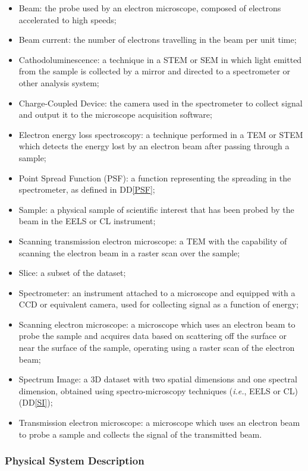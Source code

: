 \documentclass[12pt]{article}
\newcommand{\ddref}[1]{DD\ref{#1}}
\begin{document}
\begin{itemize}
	\item Beam: the probe used by an electron microscope, composed of electrons accelerated to high speeds;
	\item Beam current: the number of electrons travelling in the beam per unit time;
	\item Cathodoluminescence: a technique in a STEM or SEM in which light emitted from the sample is collected by a mirror and directed to a spectrometer or other analysis system;
	\item Charge-Coupled Device: the camera used in the spectrometer to collect signal and output it to the microscope acquisition software;
	\item Electron energy loss spectroscopy: a technique performed in a TEM or STEM which detects the energy lost by an electron beam after passing through a sample;
	\item Point Spread Function (PSF): a function representing the spreading in the spectrometer, as defined in \ddref{PSF};
	\item Sample: a physical sample of scientific interest that has been probed by the beam in the EELS or CL instrument; 
	\item Scanning transmission electron microscope: a TEM with the capability of scanning the electron beam in a raster scan over the sample;
	\item Slice: a subset of the dataset;
	\item Spectrometer: an instrument attached to a microscope and equipped with a CCD or equivalent camera, used for collecting signal as a function of energy;
	\item Scanning electron microscope: a microscope which uses an electron beam to probe the sample and acquires data based on scattering off the surface or near the surface of the sample, operating using a raster scan of the electron beam;
	\item Spectrum Image: a 3D dataset with two spatial dimensions and one spectral dimension, obtained using spectro-microscopy techniques (\textit{i.e.}, EELS or CL) (\ddref{SI});
	\item Transmission electron microscope: a microscope which uses an electron beam to probe a sample and collects the signal of the transmitted beam.
\end{itemize}

\subsubsection{Physical System Description}
\end{document}
